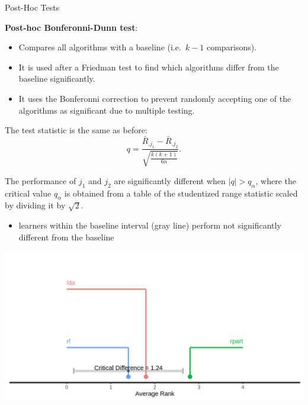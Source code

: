\begin{frame}[c,allowframebreaks]{Post-Hoc Tests}
    \framebreak

    \textbf{Post-hoc Bonferonni-Dunn test}:

    \begin{itemize}
    \item Compares all algorithms with a baseline (i.e.\ $k-1$ comparisons).
    \item It is used after a Friedman test to find which algorithms differ from the baseline significantly.
    \item It uses the Bonferonni correction to prevent randomly accepting one of the algorithms as significant due to multiple testing.
    \end{itemize}
    The test statistic is the same as before:
    $$q = \frac{\bar{R}_{.j_1} - \bar{R}_{.j_2}}{\sqrt{\frac{k(k+1)}{6n}}}.$$

    The performance of $j_1$ and $j_2$ are significantly different when $|q| > q_{\alpha}$, where the critical value $q_{\alpha}$ is obtained from a table of the studentized range statistic scaled by dividing it by $\sqrt{2}$.

    \framebreak

    \begin{itemize}
        \item learners within the baseline interval (gray line) perform not
            significantly different from the baseline
    \end{itemize}
    \begin{center}
        \includegraphics[height=.6\textheight]{crit-diff-bd}
    \end{center}

    \end{frame}


